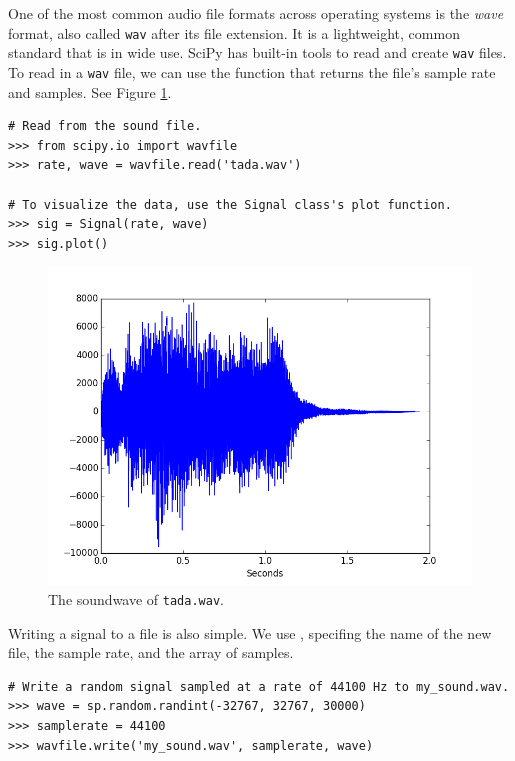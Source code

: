 One of the most common audio file formats across operating systems is the \emph{wave} format, also called \texttt{wav} after its file extension.
It is a lightweight, common standard that is in wide use.
SciPy has built-in tools to read and create \texttt{wav} files.
To read in a \texttt{wav} file, we can use the  function that returns the file's sample rate and samples.
See Figure \ref{fig:tada_sig}.

\begin{lstlisting}
# Read from the sound file.
>>> from scipy.io import wavfile
>>> rate, wave = wavfile.read('tada.wav')

# To visualize the data, use the Signal class's plot function.
>>> sig = Signal(rate, wave)
>>> sig.plot()
\end{lstlisting}

\begin{figure}[ht]
\centering
\includegraphics[width=\textwidth]{figures/tada.png}
\caption{The soundwave of \texttt{tada.wav}.}
\label{fig:tada_sig}
\end{figure}

Writing a signal to a file is also simple.
We use , specifing the name of the new file, the sample rate, and the array of samples.

\begin{lstlisting}
# Write a random signal sampled at a rate of 44100 Hz to my_sound.wav.
>>> wave = sp.random.randint(-32767, 32767, 30000)
>>> samplerate = 44100
>>> wavfile.write('my_sound.wav', samplerate, wave)
\end{lstlisting}


